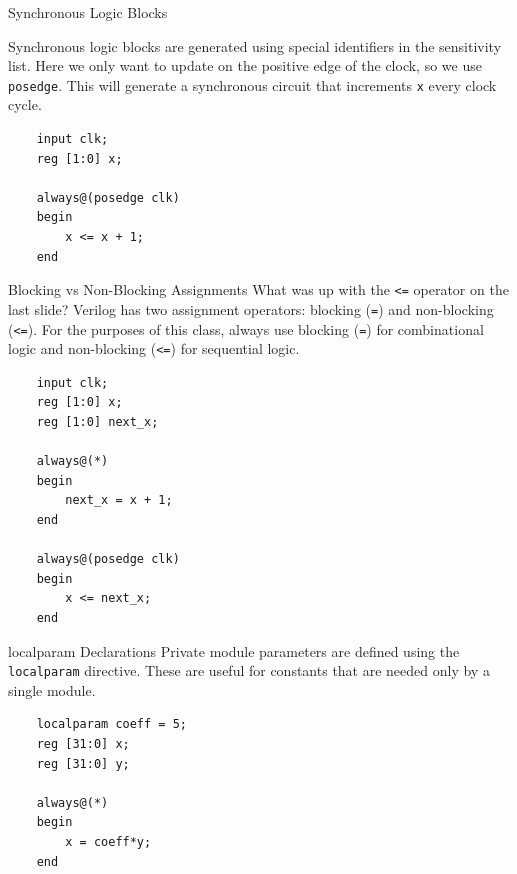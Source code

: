 \documentclass{beamer}
\begin{document}
\begin{frame}[fragile]{Synchronous Logic Blocks}

	Synchronous logic blocks are generated using special identifiers in the sensitivity list.
	Here we only want to update on the positive edge of the clock, so we use \texttt{posedge}.
	This will generate a synchronous circuit that increments \texttt{x} every clock cycle.

\begin{verbatim}
	input clk;
	reg [1:0] x;

	always@(posedge clk)
	begin
		x <= x + 1;
	end
\end{verbatim}

\end{frame}

\begin{frame}[fragile]{Blocking vs Non-Blocking Assignments}
	What was up with the \texttt{<=} operator on the last slide?
	Verilog has two assignment operators: blocking (\texttt{=}) and non-blocking (\texttt{<=}).
	For the purposes of this class, always use blocking (\texttt{=}) for combinational logic and non-blocking (\texttt{<=}) for sequential logic.

\begin{verbatim}
	input clk;
	reg [1:0] x;
	reg [1:0] next_x;

	always@(*)
	begin
		next_x = x + 1;
	end

	always@(posedge clk)
	begin
		x <= next_x;
	end
\end{verbatim}

\end{frame}

\begin{frame}[fragile]{localparam Declarations}
	Private module parameters are defined using the \texttt{localparam} directive.
	These are useful for constants that are needed only by a single module.

\begin{verbatim}
	localparam coeff = 5;
	reg [31:0] x;
	reg [31:0] y;

	always@(*)
	begin
		x = coeff*y;
	end

\end{verbatim}

\end{frame}
\end{document}
